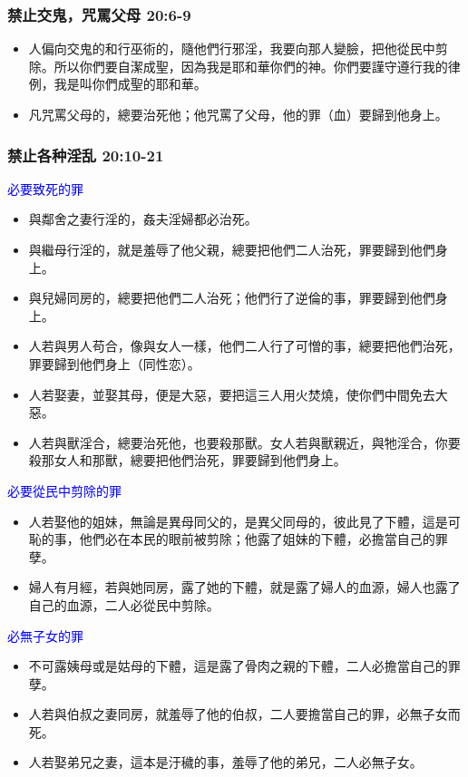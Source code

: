 \subsubsection{禁止交鬼，咒罵父母 20:6-9}
\begin{itemize} 
\itemsep-.35em
\item 人偏向交鬼的和行巫術的，隨他們行邪淫，我要向那人變臉，把他從民中剪除。所以你們要自潔成聖，因為我是耶和華你們的神。你們要謹守遵行我的律例，我是叫你們成聖的耶和華。
\item 凡咒罵父母的，總要治死他；他咒罵了父母，他的罪（血）要歸到他身上。
\end{itemize}

\subsubsection{禁止各种淫乱 20:10-21}
\textcolor{blue}{必要致死的罪}
\begin{itemize} 
\itemsep-.35em
\item 與鄰舍之妻行淫的，姦夫淫婦都必治死。
\item 與繼母行淫的，就是羞辱了他父親，總要把他們二人治死，罪要歸到他們身上。
\item 與兒婦同房的，總要把他們二人治死；他們行了逆倫的事，罪要歸到他們身上。 
\item 人若與男人苟合，像與女人一樣，他們二人行了可憎的事，總要把他們治死，罪要歸到他們身上（同性恋）。 
\item 人若娶妻，並娶其母，便是大惡，要把這三人用火焚燒，使你們中間免去大惡。
\item 人若與獸淫合，總要治死他，也要殺那獸。女人若與獸親近，與牠淫合，你要殺那女人和那獸，總要把他們治死，罪要歸到他們身上。
\end{itemize}
\textcolor{blue}{必要從民中剪除的罪}
\begin{itemize} 
\itemsep-.35em
\item 人若娶他的姐妹，無論是異母同父的，是異父同母的，彼此見了下體，這是可恥的事，他們必在本民的眼前被剪除；他露了姐妹的下體，必擔當自己的罪孽。 
\item 婦人有月經，若與她同房，露了她的下體，就是露了婦人的血源，婦人也露了自己的血源，二人必從民中剪除。
\end{itemize}
\textcolor{blue}{必無子女的罪}
\begin{itemize} 
\itemsep-.35em
\item 不可露姨母或是姑母的下體，這是露了骨肉之親的下體，二人必擔當自己的罪孽。
\item 人若與伯叔之妻同房，就羞辱了他的伯叔，二人要擔當自己的罪，必無子女而死。
\item 人若娶弟兄之妻，這本是汙穢的事，羞辱了他的弟兄，二人必無子女。
\end{itemize}

